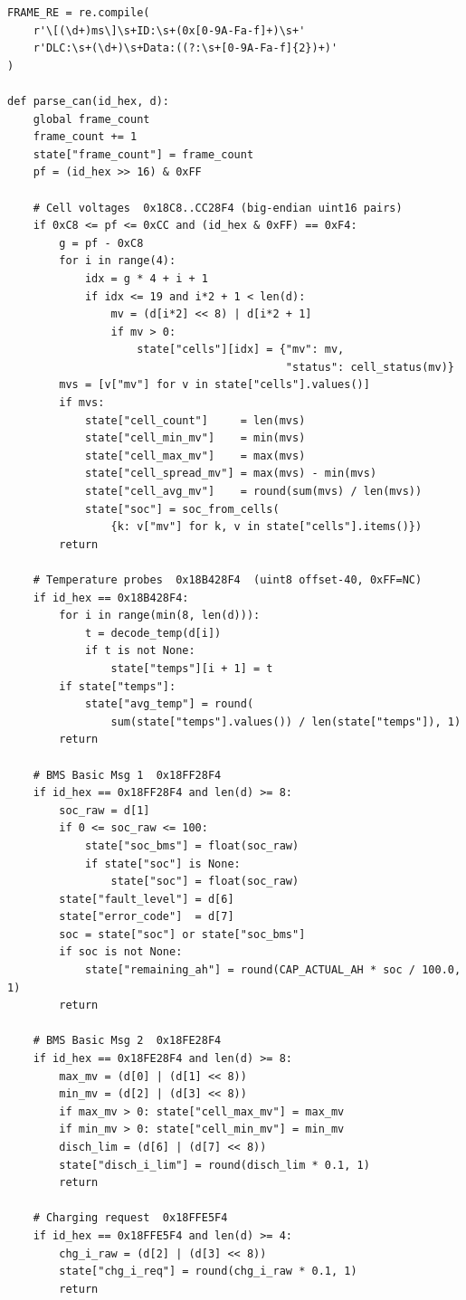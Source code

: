 \begin{lstlisting}[caption={CAN frame parser --- all five BMS frame IDs}, label={lst:py-can}]
FRAME_RE = re.compile(
    r'\[(\d+)ms\]\s+ID:\s+(0x[0-9A-Fa-f]+)\s+'
    r'DLC:\s+(\d+)\s+Data:((?:\s+[0-9A-Fa-f]{2})+)'
)

def parse_can(id_hex, d):
    global frame_count
    frame_count += 1
    state["frame_count"] = frame_count
    pf = (id_hex >> 16) & 0xFF

    # Cell voltages  0x18C8..CC28F4 (big-endian uint16 pairs)
    if 0xC8 <= pf <= 0xCC and (id_hex & 0xFF) == 0xF4:
        g = pf - 0xC8
        for i in range(4):
            idx = g * 4 + i + 1
            if idx <= 19 and i*2 + 1 < len(d):
                mv = (d[i*2] << 8) | d[i*2 + 1]
                if mv > 0:
                    state["cells"][idx] = {"mv": mv,
                                           "status": cell_status(mv)}
        mvs = [v["mv"] for v in state["cells"].values()]
        if mvs:
            state["cell_count"]     = len(mvs)
            state["cell_min_mv"]    = min(mvs)
            state["cell_max_mv"]    = max(mvs)
            state["cell_spread_mv"] = max(mvs) - min(mvs)
            state["cell_avg_mv"]    = round(sum(mvs) / len(mvs))
            state["soc"] = soc_from_cells(
                {k: v["mv"] for k, v in state["cells"].items()})
        return

    # Temperature probes  0x18B428F4  (uint8 offset-40, 0xFF=NC)
    if id_hex == 0x18B428F4:
        for i in range(min(8, len(d))):
            t = decode_temp(d[i])
            if t is not None:
                state["temps"][i + 1] = t
        if state["temps"]:
            state["avg_temp"] = round(
                sum(state["temps"].values()) / len(state["temps"]), 1)
        return

    # BMS Basic Msg 1  0x18FF28F4
    if id_hex == 0x18FF28F4 and len(d) >= 8:
        soc_raw = d[1]
        if 0 <= soc_raw <= 100:
            state["soc_bms"] = float(soc_raw)
            if state["soc"] is None:
                state["soc"] = float(soc_raw)
        state["fault_level"] = d[6]
        state["error_code"]  = d[7]
        soc = state["soc"] or state["soc_bms"]
        if soc is not None:
            state["remaining_ah"] = round(CAP_ACTUAL_AH * soc / 100.0, 1)
        return

    # BMS Basic Msg 2  0x18FE28F4
    if id_hex == 0x18FE28F4 and len(d) >= 8:
        max_mv = (d[0] | (d[1] << 8))
        min_mv = (d[2] | (d[3] << 8))
        if max_mv > 0: state["cell_max_mv"] = max_mv
        if min_mv > 0: state["cell_min_mv"] = min_mv
        disch_lim = (d[6] | (d[7] << 8))
        state["disch_i_lim"] = round(disch_lim * 0.1, 1)
        return

    # Charging request  0x18FFE5F4
    if id_hex == 0x18FFE5F4 and len(d) >= 4:
        chg_i_raw = (d[2] | (d[3] << 8))
        state["chg_i_req"] = round(chg_i_raw * 0.1, 1)
        return
\end{lstlisting}

